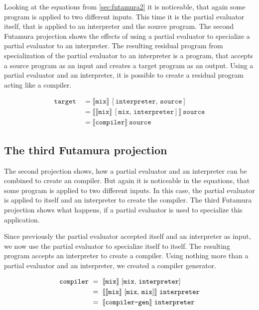 Looking at the equations from \ref{sec:futamura2} it is noticeable, that again some program is applied to two different inputs.
This time it is the partial evaluator itself, that is applied to an interpreter and the source program.
The second Futamura projection shows the effects of using a partial evaluator to specialize a partial evaluator to an interpreter.
The resulting residual program from specialization of the partial evaluator to an interpreter is a program, that accepts a source program as an input and creates a target program as an output.
Using a partial evaluator and an interpreter, it is possible to create a residual program acting like a compiler.

\begin{align*}
  \mathtt{target}\ &= \llbracket \mathtt{mix}\rrbracket\ [\mathtt{interpreter},\, \mathtt{source} ] \\
                   &= \llbracket \llbracket \mathtt{mix} \rrbracket\ [\mathtt{mix},\, \mathtt{interpreter}] \rrbracket\ \mathtt{source} \\
                   &= \llbracket \mathtt{compiler} \rrbracket\ \mathtt{source}
\end{align*}


\subsection{The third Futamura projection}\label{sec:futamura3}

The second projection shows, how a partial evaluator and an interpreter can be combined to create an compiler.
But again it is noticeable in the equations, that some program is applied to two different inputs.
In this case, the partial evaluator is applied to itself and an interpreter to create the compiler.
The third Futamura projection shows what happens, if a partial evaluator is used to specialize this application.

Since previously the partial evaluator accepted itself and an interpreter as input, we now use the partial evaluator to specialize itself to itself.
The resulting program accepts an interpreter to create a compiler.
Using nothing more than a partial evaluator and an interpreter, we created a compiler generator.

\begin{align*}
  \mathtt{compiler}\ &=\ \llbracket \mathtt{mix} \rrbracket\ [\mathtt{mix},\, \mathtt{interpreter}] \\
                     &=\ \llbracket \llbracket \mathtt{mix} \rrbracket\ [\mathtt{mix},\, \mathtt{mix}] \rrbracket\ \mathtt{interpreter} \\
                     &=\ \llbracket \text{\texttt{compiler-gen}} \rrbracket\ \mathtt{interpreter}
\end{align*}

